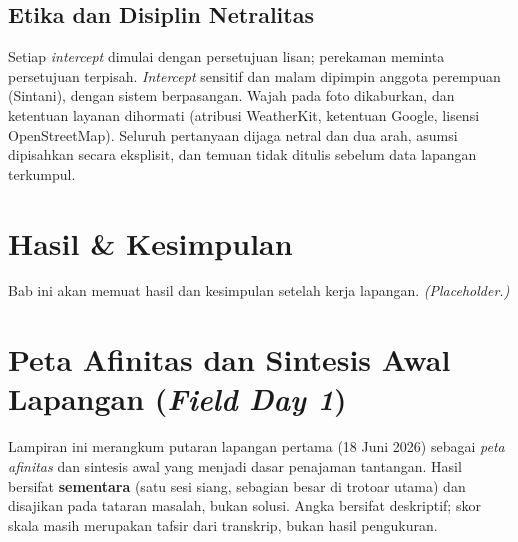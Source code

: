 \documentclass[11pt,a4paper]{report}
\begin{document}
\section{Etika dan Disiplin Netralitas}
Setiap \emph{intercept} dimulai dengan persetujuan lisan; perekaman meminta persetujuan terpisah.
\emph{Intercept} sensitif dan malam dipimpin anggota perempuan (Sintani), dengan sistem
berpasangan. Wajah pada foto dikaburkan, dan ketentuan layanan dihormati (atribusi WeatherKit,
ketentuan Google, lisensi OpenStreetMap). Seluruh pertanyaan dijaga netral dan dua arah, asumsi
dipisahkan secara eksplisit, dan temuan tidak ditulis sebelum data lapangan terkumpul.

\chapter{Hasil \& Kesimpulan}    %
Bab ini akan memuat hasil dan kesimpulan setelah kerja lapangan. \textit{(Placeholder.)}

\appendix
\chapter{Peta Afinitas dan Sintesis Awal Lapangan (\textit{Field Day 1})}
\label{app:affinity}
Lampiran ini merangkum putaran lapangan pertama (18 Juni 2026) sebagai \emph{peta afinitas} dan
sintesis awal yang menjadi dasar penajaman tantangan. Hasil bersifat \textbf{sementara} (satu sesi
siang, sebagian besar di trotoar utama) dan disajikan pada tataran masalah, bukan solusi. Angka
bersifat deskriptif; skor skala masih merupakan tafsir dari transkrip, bukan hasil pengukuran.

\bigskip
\def\affinityembedded{}


\printbibliography[title={Daftar Pustaka}]
\end{document}
